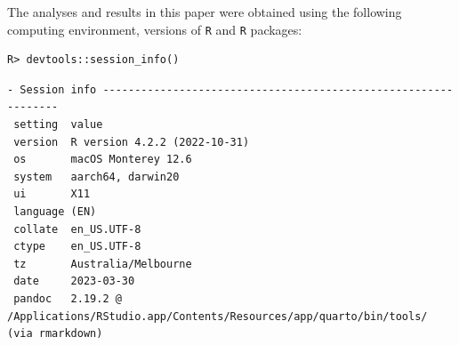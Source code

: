 \documentclass[article]{jss}
\begin{document}
\begin{tcolorbox}[enhanced jigsaw, arc=.35mm, breakable, colback=white, colframe=quarto-callout-color-frame, leftrule=.75mm, rightrule=.15mm, opacityback=0, bottomrule=.15mm, left=2mm, toprule=.15mm]

The analyses and results in this paper were obtained using the following
computing environment, versions of \texttt{R} and \texttt{R} packages:

\begin{verbatim}
R> devtools::session_info()
\end{verbatim}

\begin{verbatim}
- Session info ---------------------------------------------------------------
 setting  value
 version  R version 4.2.2 (2022-10-31)
 os       macOS Monterey 12.6
 system   aarch64, darwin20
 ui       X11
 language (EN)
 collate  en_US.UTF-8
 ctype    en_US.UTF-8
 tz       Australia/Melbourne
 date     2023-03-30
 pandoc   2.19.2 @ /Applications/RStudio.app/Contents/Resources/app/quarto/bin/tools/ (via rmarkdown)


\end{verbatim}
\end{tcolorbox}
\end{document}
